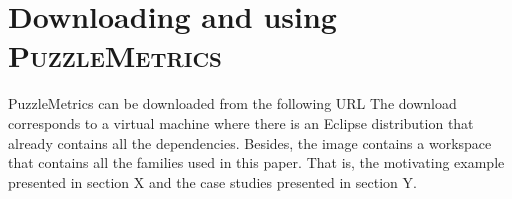 \section{Downloading and using \textsc{PuzzleMetrics}}
\label{sec:puzzlemetrics}

PuzzleMetrics can be downloaded from the following URL The download corresponds to a virtual machine where there is an Eclipse distribution that already contains all the dependencies. Besides, the image contains a workspace that contains all the families used in this paper. That is, the motivating example presented in section X and the case studies presented in section Y.  

